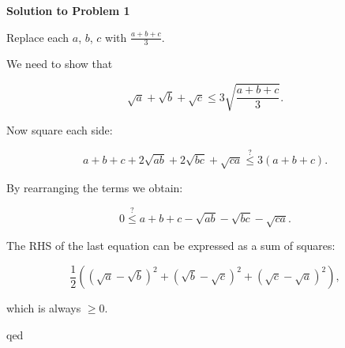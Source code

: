 \documentclass{article}
\begin{document}
           
{\bf Solution to Problem 1}

Replace each $a$, $b$, $c$ with $\frac{a+b+c}{3}$.

We need to show that 

\begin{equation*}
  \sqrt{a}+\sqrt{b}+\sqrt{c}\overset{}{\leq}3\sqrt{\frac{a+b+c}{3}}.
\end{equation*}

Now square each side:

\begin{equation*}
  a+b+c+2\sqrt{ab}+2\sqrt{bc}+\sqrt{ca}\overset{?}{\leq}3\left(a+b+c\right).
\end{equation*}

By rearranging the terms we obtain:

\begin{equation*}
  0\overset{?}{\leq}a+b+c-\sqrt{ab}-\sqrt{bc}-\sqrt{ca}.
\end{equation*}


The RHS of the last equation can be expressed as a sum of squares:

\begin{equation*}
  \frac{1}{2}\left(\left(\sqrt{a}-\sqrt{b}\right)^2+\left(\sqrt{b}-\sqrt{c}\right)^2+\left(\sqrt{c}-\sqrt{a}\right)^2\right),
\end{equation*}

which is always $\geq0$.

qed
\end{document}
